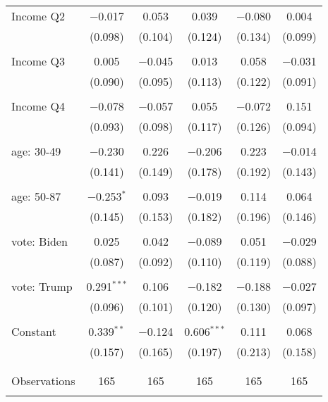 \begin{tabular}{@{\extracolsep{5pt}}lccccc}
 Income Q2 & $-$0.017 & 0.053 & 0.039 & $-$0.080 & 0.004 \\ 
  & (0.098) & (0.104) & (0.124) & (0.134) & (0.099) \\ 
  & & & & & \\ 
 Income Q3 & 0.005 & $-$0.045 & 0.013 & 0.058 & $-$0.031 \\ 
  & (0.090) & (0.095) & (0.113) & (0.122) & (0.091) \\ 
  & & & & & \\ 
 Income Q4 & $-$0.078 & $-$0.057 & 0.055 & $-$0.072 & 0.151 \\ 
  & (0.093) & (0.098) & (0.117) & (0.126) & (0.094) \\ 
  & & & & & \\ 
 age: 30-49 & $-$0.230 & 0.226 & $-$0.206 & 0.223 & $-$0.014 \\ 
  & (0.141) & (0.149) & (0.178) & (0.192) & (0.143) \\ 
  & & & & & \\ 
 age: 50-87 & $-$0.253$^{*}$ & 0.093 & $-$0.019 & 0.114 & 0.064 \\ 
  & (0.145) & (0.153) & (0.182) & (0.196) & (0.146) \\ 
  & & & & & \\ 
 vote: Biden & 0.025 & 0.042 & $-$0.089 & 0.051 & $-$0.029 \\ 
  & (0.087) & (0.092) & (0.110) & (0.119) & (0.088) \\ 
  & & & & & \\ 
 vote: Trump & 0.291$^{***}$ & 0.106 & $-$0.182 & $-$0.188 & $-$0.027 \\ 
  & (0.096) & (0.101) & (0.120) & (0.130) & (0.097) \\ 
  & & & & & \\ 
 Constant & 0.339$^{**}$ & $-$0.124 & 0.606$^{***}$ & 0.111 & 0.068 \\ 
  & (0.157) & (0.165) & (0.197) & (0.213) & (0.158) \\ 
  & & & & & \\ 
\hline \\[-1.8ex] 

Observations & 165 & 165 & 165 & 165 & 165 \\ 
\hline 
\hline \\[-1.8ex] 
\end{tabular} 